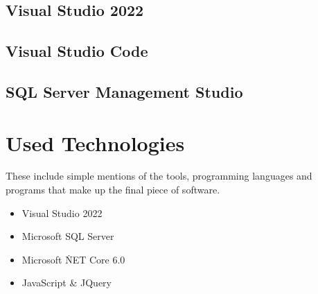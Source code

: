     \subsection{Visual Studio 2022}

    \subsection{Visual Studio Code}

    \subsection{SQL Server Management Studio}

\section{Used Technologies}
These include simple mentions of the tools, programming languages and programs that make up the final piece of software.
\begin{itemize}
    \item Visual Studio 2022
    \item Microsoft SQL Server
    \item Microsoft \.NET Core 6.0
    \item JavaScript \& JQuery
\end{itemize}